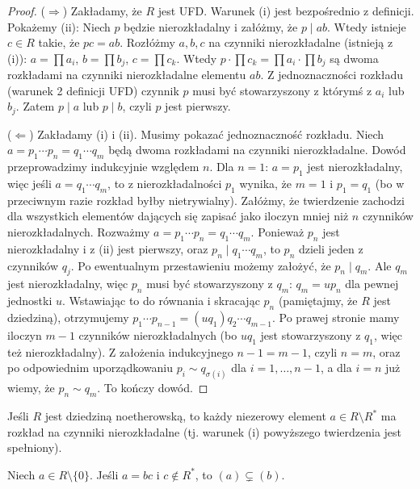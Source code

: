\begin{proof}
($\Rightarrow$) Zakładamy, że $R$ jest UFD. Warunek (i) jest bezpośrednio z definicji. Pokażemy (ii): Niech $p$ będzie nierozkładalny i załóżmy, że $p \mid ab$. Wtedy istnieje $c \in R$ takie, że $pc = ab$. Rozłóżmy $a, b, c$ na czynniki nierozkładalne (istnieją z (i)): $a = \prod a_i$, $b = \prod b_j$, $c = \prod c_k$. Wtedy $p \cdot \prod c_k = \prod a_i \cdot \prod b_j$ są dwoma rozkładami na czynniki nierozkładalne elementu $ab$. Z jednoznaczności rozkładu (warunek 2 definicji UFD) czynnik $p$ musi być stowarzyszony z którymś z $a_i$ lub $b_j$. Zatem $p \mid a$ lub $p \mid b$, czyli $p$ jest pierwszy.

($\Leftarrow$) Zakładamy (i) i (ii). Musimy pokazać jednoznaczność rozkładu. Niech $a = p_1 \cdots p_n = q_1 \cdots q_m$ będą dwoma rozkładami na czynniki nierozkładalne. Dowód przeprowadzimy indukcyjnie względem $n$. Dla $n=1$: $a = p_1$ jest nierozkładalny, więc jeśli $a = q_1 \cdots q_m$, to z nierozkładalności $p_1$ wynika, że $m=1$ i $p_1 = q_1$ (bo w przeciwnym razie rozkład byłby nietrywialny). Załóżmy, że twierdzenie zachodzi dla wszystkich elementów dających się zapisać jako iloczyn mniej niż $n$ czynników nierozkładalnych. Rozważmy $a = p_1 \cdots p_n = q_1 \cdots q_m$. Ponieważ $p_n$ jest nierozkładalny i z (ii) jest pierwszy, oraz $p_n \mid q_1 \cdots q_m$, to $p_n$ dzieli jeden z czynników $q_j$. Po ewentualnym przestawieniu możemy założyć, że $p_n \mid q_m$. Ale $q_m$ jest nierozkładalny, więc $p_n$ musi być stowarzyszony z $q_m$: $q_m = u p_n$ dla pewnej jednostki $u$. Wstawiając to do równania i skracając $p_n$ (pamiętajmy, że $R$ jest dziedziną), otrzymujemy $p_1 \cdots p_{n-1} = (u q_1) q_2 \cdots q_{m-1}$. Po prawej stronie mamy iloczyn $m-1$ czynników nierozkładalnych (bo $u q_1$ jest stowarzyszony z $q_1$, więc też nierozkładalny). Z założenia indukcyjnego $n-1 = m-1$, czyli $n = m$, oraz po odpowiednim uporządkowaniu $p_i \sim q_{\sigma(i)}$ dla $i=1,\dots,n-1$, a dla $i=n$ już wiemy, że $p_n \sim q_m$. To kończy dowód.
\end{proof}

\begin{theorem}
Jeśli $R$ jest dziedziną noetherowską, to każdy niezerowy element $a \in R \setminus R^*$ ma rozkład na czynniki nierozkładalne (tj. warunek (i) powyższego twierdzenia jest spełniony).
\end{theorem}

\begin{lemma}
Niech $a \in R \setminus \{0\}$. Jeśli $a = bc$ i $c \notin R^*$, to $(a) \subsetneq (b)$.
\end{lemma}

